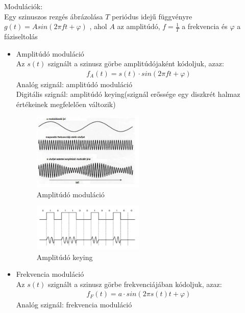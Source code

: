 \documentclass[margin=0px]{article}
\begin{document}
\begin{description}
\begin{itemize}
						Modulációk:\\
						Egy szinuszos rezgés ábrázolása $T$ periódus idejű függvényre $g(t)=Asin(2\pi f t + \varphi)$ , ahol $A$ az amplitúdó, $f = \frac{1}{T}$ a frekvencia és $\varphi $ a fáziseltolás
						\begin{itemize}
							\item Amplitúdó moduláció \\
								Az $s(t)$ szignált a szinusz görbe amplitúdójaként kódoljuk, azaz:
								\begin{align*}
									f_A(t) = s(t) \cdot sin(2\pi f t + \varphi)
								\end{align*}
								Analóg szignál: amplitúdó moduláció\\
								Digitális szignál: amplitúdó keying(szignál erőssége egy diszkrét halmaz értékeinek megfelelően változik)
								\begin{figure}[H]
									\centering
									\includegraphics[width=0.5\textwidth]{img/amplitudo_mod.png}
									\caption{Amplitúdó moduláció}
								\end{figure}
								\begin{figure}[H]
									\centering
									\includegraphics[width=0.5\textwidth]{img/amplitudo_key.png}
									\caption{Amplitúdó keying}
								\end{figure}
							\item Frekvencia moduláció \\
								Az $s(t)$ szignált a szinusz görbe frekvenciájában kódoljuk, azaz:
								\begin{align*}
									f_F(t) = a \cdot sin(2\pi s(t) t + \varphi)
								\end{align*}
								Analóg szignál: frekvencia moduláció\\

\end{itemize}
\end{itemize}
\end{description}
\end{document}
